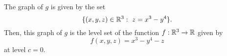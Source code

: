 
\begin{solution}
    The graph of $g$ is given by the set
    $$\{(x,y,z)\in\rl^3:\ z=x^3-y^4\}.$$
    Then, this graph of $g$ is the level
    set of the function $f:\mathbb{R}^3\to\mathbb{R}$
    given by
    $$f(x,y,z)=x^3-y^4-z$$
    at level $c=0$.
\end{solution}